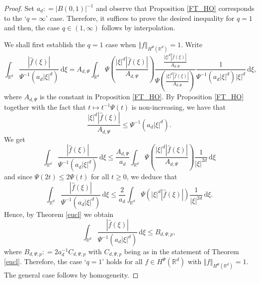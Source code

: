 \documentclass[a4paper, leqno, 10pt]{amsart}
\numberwithin{equation}{section}
\newcommand{\dd}{\mathrm{d}}
\newcommand{\R}{\mathbb{R}}
\newcommand{\norm}[1]{\left\Vert#1\right\Vert}
\newcommand{\brkt}[1]{\left(#1\right)}
\newcommand{\abs}[1]{\left|#1\right|}
\begin{document}
\begin{proof} Set $a_d : = \abs{B(0,1)}^{-1}$ and observe that Proposition \ref{FT_HO} corresponds to the `$q=\infty$' case. Therefore, it suffices to prove the desired inequality for $q=1$ and then, the case $q \in (1, 
\infty)$ follows by interpolation.

We shall first establish the  $q=1$ case when $\norm{f}_{H^{\Psi} (\R^d)} = 1$. Write
\[ \int_{\R^d} \frac{\abs{\widehat{f}(\xi)}}{\Psi^{-1}( a_d \abs{\xi}^d)} \, \dd \xi= 
A_{d, \Psi} \int_{\R^d}  
\Psi \brkt{ \frac{ \abs{\xi}^d \abs{\widehat{f}(\xi)} } {A_{d, \Psi}}}
 \frac{\frac{ \abs{\xi}^d\abs{\widehat{f}(\xi)}}{A_{d, \Psi}}}{ \Psi \brkt{ \frac{\abs{\xi}^d \abs{\widehat{f}(\xi)}} {A_{d, \Psi}} }} \frac{1}{\Psi^{-1}(a_d \abs{\xi}^d) \abs{\xi}^d} \, \dd \xi ,
\]
where $A_{d, \Psi}$ is the constant in Proposition \ref{FT_HO}.  By Proposition \ref{FT_HO} together with the fact that $t \mapsto t^{-1 } \Psi (t)$ is non-increasing, we have that
\[
\frac{ \abs{\xi}^d \abs{\widehat{f}(\xi)} }{ A_{d, \Psi} } \leq \Psi^{-1}(a_d \abs{\xi}^d).
\]
We get
\[
\int_{\R^d} \frac{\abs{\widehat{f}(\xi)}}{\Psi^{-1}( a_d \abs{\xi}^d)} \, \dd \xi \leq    
\frac{ A_{d, \Psi} } {a_d} \int_{\R^d}  
\Psi \brkt{ \frac{ \abs{\xi}^d \abs{\widehat{f}(\xi)} } {A_{d, \Psi}}}
  \frac{1} { \abs{\xi}^{2d} } \, \dd \xi
\]
and since $\Psi (2t) \leq 2 \Psi (t)$ for all $t \geq 0$, we deduce that
\[ 
\int_{\R^d} \frac{\abs{\widehat{f}(\xi)}}{\Psi^{-1}( a_d \abs{\xi}^d)} \, \dd \xi \leq    
\frac{ 2 } {a_d} \int_{\R^d}  
\Psi \brkt{   \abs{\xi}^d \abs{\widehat{f}(\xi)}  }
\frac{1} { \abs{\xi}^{2d} } \, \dd \xi .
\]
Hence, by Theorem \ref{eucl} we obtain 
\[
\int_{\R^d} \frac{\abs{\widehat{f}(\xi)}}{\Psi^{-1}( a_d \abs{\xi}^d)}  \,\dd \xi \leq    
B_{d, \Psi, p} ,  
\]
where $ B_{d, \Psi, p} : = 2 a_d^{-1} C_{d, \Psi, p}$ with $C_{d, \Psi, p}$ being as in the statement of Theorem \ref{eucl}. 
Therefore, the case `$q=1$' holds for all $f\in H^{\Psi} (\R^d)$ with $\norm{f}_{H^{\Psi} (\R^d) } = 1$. The general case follows by homogeneity.
\end{proof}
\end{document}
